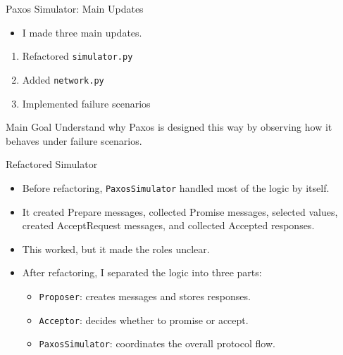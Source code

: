 \documentclass[aspectratio=169]{beamer}
\begin{document}
\begin{frame}{Paxos Simulator: Main Updates}
  \begin{itemize}
    \item I made three main updates.
  \end{itemize}

  \vspace{0.5em}

  \begin{enumerate}
    \item Refactored \texttt{simulator.py}
    \item Added \texttt{network.py}
    \item Implemented failure scenarios
  \end{enumerate}

  \vspace{0.5em}

  \begin{block}{Main Goal}
    Understand why Paxos is designed this way by observing how it behaves under failure scenarios.
  \end{block}
\end{frame}

\begin{frame}{Refactored Simulator}
  \begin{itemize}
    \item Before refactoring, \texttt{PaxosSimulator} handled most of the logic by itself.
    \item It created Prepare messages, collected Promise messages, selected values, created AcceptRequest messages, and collected Accepted responses.
    \item This worked, but it made the roles unclear.
    \item After refactoring, I separated the logic into three parts:
    \begin{itemize}
      \item \texttt{Proposer}: creates messages and stores responses.
      \item \texttt{Acceptor}: decides whether to promise or accept.
      \item \texttt{PaxosSimulator}: coordinates the overall protocol flow.
    \end{itemize}
  \end{itemize}
\end{frame}
\end{document}

